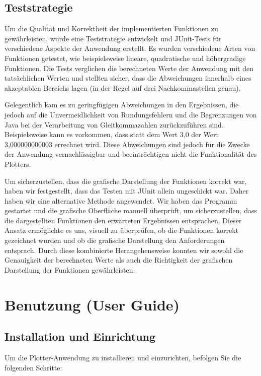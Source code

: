 \documentclass[a4paper]{article}
\begin{document}
\subsection{Teststrategie}
Um die Qualität und Korrektheit der implementierten Funktionen zu gewährleisten, wurde eine Teststrategie entwickelt und JUnit-Tests für verschiedene Aspekte der Anwendung erstellt. Es wurden verschiedene Arten von Funktionen getestet, wie beispielsweise lineare, quadratische und höhergradige Funktionen. Die Tests verglichen die berechneten Werte der Anwendung mit den tatsächlichen Werten und stellten sicher, dass die Abweichungen innerhalb eines akzeptablen Bereichs lagen (in der Regel auf drei Nachkommastellen genau).

Gelegentlich kam es zu geringfügigen Abweichungen in den Ergebnissen, die jedoch auf die Unvermeidlichkeit von Rundungsfehlern und die Begrenzungen von Java bei der Verarbeitung von Gleitkommazahlen zurückzuführen sind. Beispielsweise kann es vorkommen, dass statt dem Wert 3,0 der Wert 3,000000000003 errechnet wird. Diese Abweichungen sind jedoch für die Zwecke der Anwendung vernachlässigbar und beeinträchtigen nicht die Funktionalität des Plotters.

Um sicherzustellen, dass die grafische Darstellung der Funktionen korrekt war, haben wir festgestellt, dass das Testen mit JUnit allein ungeschickt war. Daher haben wir eine alternative Methode angewendet. Wir haben das Programm gestartet und die grafische Oberfläche manuell überprüft, um sicherzustellen, dass die dargestellten Funktionen den erwarteten Ergebnissen entsprachen. Dieser Ansatz ermöglichte es uns, visuell zu überprüfen, ob die Funktionen korrekt gezeichnet wurden und ob die grafische Darstellung den Anforderungen entsprach. Durch diese kombinierte Herangehensweise konnten wir sowohl die Genauigkeit der berechneten Werte als auch die Richtigkeit der grafischen Darstellung der Funktionen gewährleisten.
\newpage

\section{Benutzung (User Guide)}

\subsection{Installation und Einrichtung}
Um die Plotter-Anwendung zu installieren und einzurichten, befolgen Sie die folgenden Schritte:
\end{document}
